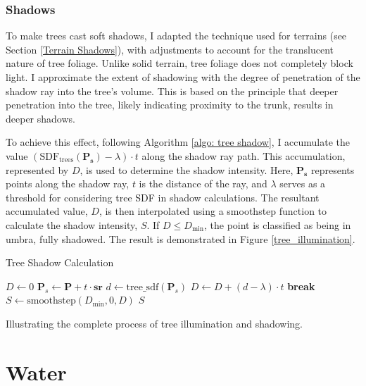 \subsubsection{Shadows}

To make trees cast soft shadows, I adapted the technique used for terrains (see Section \ref{Terrain Shadows}), with adjustments to account for the translucent nature of tree foliage. Unlike solid terrain, tree foliage does not completely block light. I approximate the extent of shadowing with the degree of penetration of the shadow ray into the tree's volume. This is based on the principle that deeper penetration into the tree, likely indicating proximity to the trunk, results in deeper shadows.

To achieve this effect, following Algorithm \ref{algo: tree shadow}, I accumulate the value $(\text{SDF}_{\text{trees}}(\mathbf{P_s}) - \lambda) \cdot t$ along the shadow ray path. This accumulation, represented by $D$, is used to determine the shadow intensity. Here, $\mathbf{P_s}$ represents points along the shadow ray, $t$ is the distance of the ray, and $\lambda$ serves as a threshold for considering tree SDF in shadow calculations. The resultant accumulated value, $D$, is then interpolated using a smoothstep function to calculate the shadow intensity, $S$. If $D \le D_{\text{min}}$, the point is classified as being in umbra, fully shadowed. The result is demonstrated in Figure \ref{tree_illumination}.

\begin{algorithm}
\caption{Tree Shadow Calculation}
\label{algo: tree shadow}
\begin{algorithmic}
    \State $D \gets 0$
        \State $\mathbf{P}_s \gets \mathbf{P} + t \cdot \mathbf{sr}$
        \State $d \gets \text{tree\_sdf}(\mathbf{P}_s)$
            \State $D \gets D + (d - \lambda) \cdot t$
        \EndIf
            \State \textbf{break}
        \EndIf
    \EndFor
    \State $S \gets \text{smoothstep}(D_{\text{min}}, 0, D)$
    \State \Return $S$
\EndFunction
\end{algorithmic}
\end{algorithm}

{Illustrating the complete process of tree illumination and shadowing.}

\section{Water}

